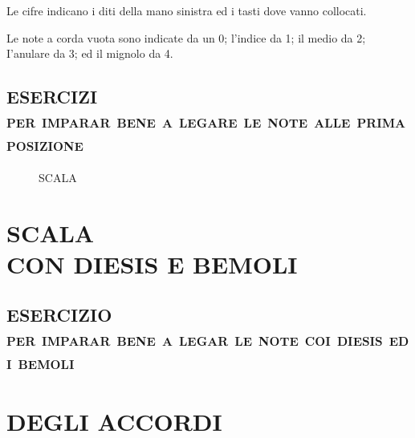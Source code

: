 \documentclass[a4paper]{book}
\begin{document}
Le cifre indicano i diti della mano sinistra ed i tasti dove vanno collocati.

Le note a corda vuota sono indicate da un 0; l'indice da 1; il medio da 2; I'anulare da 3; ed il mignolo da 4.

\begin{figure}[h]
  \centering
  \label{fig:first-position}
\end{figure}

\section*{ESERCIZI\\
  \normalsize\textsc{\mdseries per imparar bene a legare le note alle prima posizione}}

\begin{figure}[h]
  \centering
  \caption{\large SCALA}
  \label{fig:scale}
\end{figure}
\clearpage


\chapter[Scala con diesis e bemoli, ed un esercizio]{%
  SCALA\\
  \small CON DIESIS E BEMOLI}

\begin{figure}[H]
  \centering
  \label{fig:first-position-chromatic}
\end{figure}

\section*{ESERCIZIO\\
  \normalsize\textsc{\mdseries per imparar bene a legar le note coi diesis ed i bemoli}}

\begin{figure}[H]
  \centering
\end{figure}
\clearpage

\chapter[Il piccolo e grande accordo]{DEGLI ACCORDI}
\end{document}
